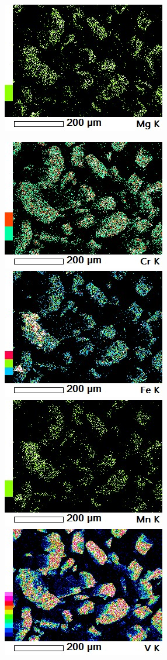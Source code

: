 \documentclass[12pt]{article}
\begin{document}
\begin{figure}[H]
	\includegraphics[width = 0.45\linewidth]{./pictures/map1_Mg_K.jpg} \hspace{1em}%
\end{figure}

\begin{figure}[H]
	\includegraphics[width = 0.45\linewidth]{./pictures/map1_Cr_K.jpg} \hspace{1em}%
	\includegraphics[width = 0.45\linewidth]{./pictures/map1_Fe_K.jpg} \hspace{1em}%
	\includegraphics[width = 0.45\linewidth]{./pictures/map1_Mn_K.jpg} \hspace{4.2em}%
	\includegraphics[width = 0.45\linewidth]{./pictures/map1_V_K.jpg} \hspace{1em}%
\end{figure}
\end{document}
